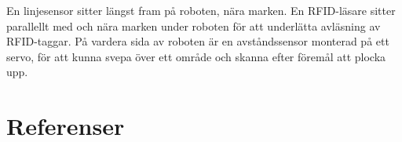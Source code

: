 \documentclass[a4paper,12pt]{article}
\begin{document}
En linjesensor sitter längst fram på roboten, nära marken. En RFID-läsare sitter parallellt med och nära marken under roboten för att underlätta avläsning av RFID-taggar. På vardera sida av roboten är en avståndssensor monterad på ett servo, för att kunna svepa över ett område och skanna efter föremål att plocka upp.









\newpage
\section*{Referenser}


\newpage
\appendix

\end{document}
